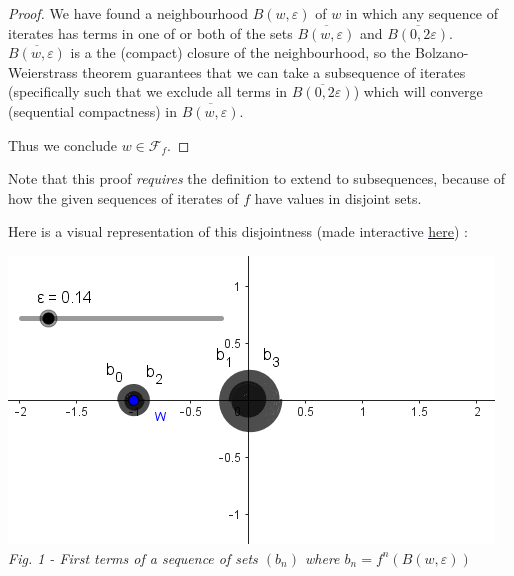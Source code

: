 \documentclass{article}
\begin{document}
\begin{proof}
We have found a neighbourhood $B(w,\varepsilon)$ of $w$ in which any sequence of iterates has terms in one of or both of the sets $\overline{B(w, \varepsilon)}$ and $\overline{B(0, 2 \varepsilon)}$. \\
\vspace{2mm}
$\overline{B(w, \varepsilon)}$ is a the (compact) closure of the neighbourhood, so the Bolzano-Weierstrass theorem guarantees that we can take a subsequence of iterates (specifically such that we exclude all terms in $\overline{B(0, 2 \varepsilon)}$) which will converge (sequential compactness) in $\overline{B(w, \varepsilon)}$. \\
\vspace{5mm}

Thus we conclude $w \in \mathcal{F}_f$. 
\end{proof}

Note that this proof \textit{requires} the definition to extend to subsequences, because of how the given sequences of iterates of $f$ have values in disjoint sets. \\
\vspace{2mm}

Here is a visual representation of this disjointness (made interactive \textcolor{blue}{\underline{\href{https://www.geogebra.org/m/eee6ukbk}{here}}}) : \\
\vspace{-3mm}
\begin{center}
\includegraphics[scale=0.9]{complementminus1} \\
\textit{Fig. 1 - First terms of a sequence of sets $(b_n)$ where $b_n = f^n(B(w, \varepsilon))$}
\end{center}
\end{document}
